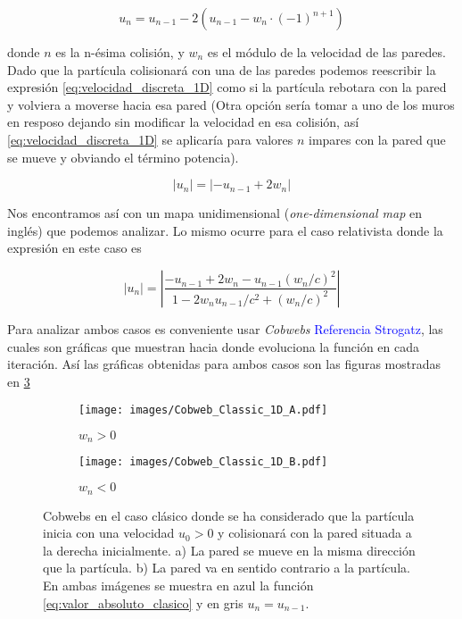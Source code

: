 \begin{equation}\label{eq:velocidad_discreta_1D}
    u_n = u_{n-1} - 2\left( u_{n-1} - w_n \cdot (-1)^{n+1} \right)
\end{equation}

donde \( n \) es la n-ésima colisión, y \( w_n \) es el módulo de la velocidad de las paredes. Dado que la partícula colisionará con una de las paredes podemos reescribir la expresión \ref{eq:velocidad_discreta_1D} como si la partícula rebotara con la pared y volviera a moverse hacia esa pared (Otra opción sería tomar a uno de los muros en resposo dejando sin modificar la velocidad en esa colisión, así \ref{eq:velocidad_discreta_1D} se aplicaría para valores \( n \) impares con la pared que se mueve y obviando el término potencia). 

\begin{equation}\label{eq:valor_absoluto_clasico}
    \left| u_n \right| =\left| -u_{n-1} + 2w_n \right|
\end{equation}

Nos encontramos así con un mapa unidimensional (\textit{one-dimensional map} en inglés) que podemos analizar. Lo mismo ocurre para el caso relativista donde la expresión en este caso es

\begin{equation}\label{eq:valor_absoluto_relativista}
    \left| u_n \right| = \left|  \dfrac{-u_{n-1} + 2w_n - u_{n-1}(w_n/c)^2}{1 - 2w_n u_{n-1}/c^2 + (w_n/c)^2} \right|
\end{equation}

Para analizar ambos casos es conveniente usar \cite{Strogatz} \textit{Cobwebs} \textcolor{blue}{Referencia Strogatz}, las cuales son gráficas que muestran hacia donde evoluciona la función en cada iteración. Así las gráficas obtenidas para ambos casos son las figuras mostradas en \ref{fig:Cobweb_Classic_1D}

\begin{figure}[H]
    \centering
    \begin{subfigure}[b]{0.49\textwidth}
        \centering
        \texttt{[image: images/Cobweb\_Classic\_1D\_A.pdf]}
        \caption{$w_n>0$}
        \label{fig:Cobweb_Classic_1D_A}
    \end{subfigure}
    \hfill
    \begin{subfigure}[b]{0.49\textwidth}
        \centering
        \texttt{[image: images/Cobweb\_Classic\_1D\_B.pdf]}
        \caption{$w_n<0$}
        \label{fig:Cobweb_Classic_1D_B}
    \end{subfigure}
    \caption{Cobwebs en el caso clásico donde se ha considerado que la partícula inicia con una velocidad $u_0 > 0$ y colisionará con la pared situada a la derecha inicialmente. a) La pared se mueve en la misma dirección que la partícula. b) La pared va en sentido contrario a la partícula. En ambas imágenes se muestra en azul la función \ref{eq:valor_absoluto_clasico} y en gris \( u_n = u_{n-1} \).}
        \label{fig:Cobweb_Classic_1D}
\end{figure}

